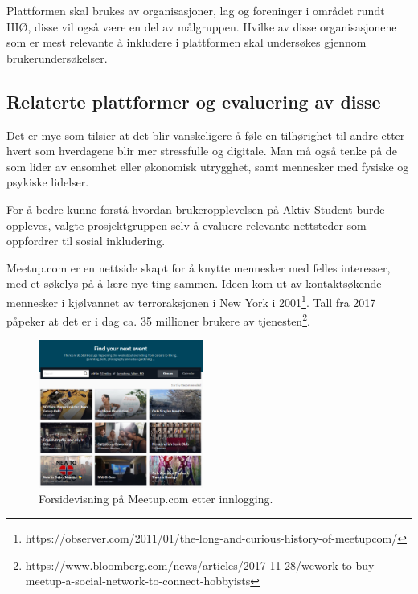 Plattformen skal brukes av organisasjoner, lag og foreninger i området rundt HIØ, disse vil også være en del av målgruppen. Hvilke av disse organisasjonene som er mest relevante å inkludere i plattformen skal undersøkes gjennom brukerundersøkelser.

\subsection{Relaterte plattformer og evaluering av disse}

Det er mye som tilsier at det blir vanskeligere å føle en tilhørighet til andre etter hvert som hverdagene blir mer stressfulle og digitale. Man må også tenke på de som lider av ensomhet eller økonomisk utrygghet, samt mennesker med fysiske og psykiske lidelser.

\vspace{5mm} %

For å bedre kunne forstå hvordan brukeropplevelsen på Aktiv Student burde oppleves, valgte prosjektgruppen selv å evaluere relevante nettsteder som oppfordrer til sosial inkludering. 

\vspace{5mm} %

Meetup.com er en nettside skapt for å knytte mennesker med felles interesser, med et søkelys på å lære nye ting sammen. Ideen kom ut av kontaktsøkende mennesker i kjølvannet av terroraksjonen i New York i 2001\footnote{https://observer.com/2011/01/the-long-and-curious-history-of-meetupcom/}. Tall fra 2017 påpeker at det er i dag ca. 35 millioner brukere av tjenesten\footnote{https://www.bloomberg.com/news/articles/2017-11-28/wework-to-buy-meetup-a-social-network-to-connect-hobbyists}.
\begin{figure}
  \begin{center}
    \includegraphics[width=0.48\textwidth]{Illustrasjoner/andre_platformer/meetup_forside.png}
  \end{center}
  \caption{Forsidevisning på Meetup.com etter innlogging.}
\end{figure}

